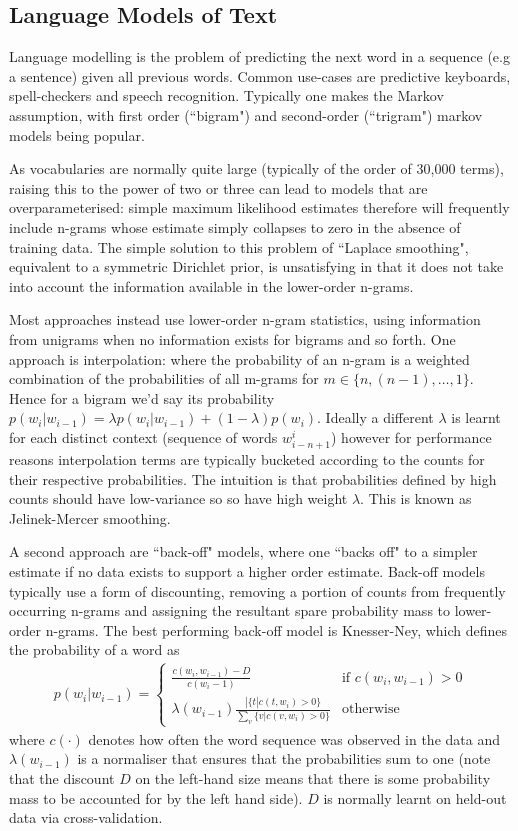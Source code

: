 

\subsection{Language Models of Text}
\label{sec:langmodels}
Language modelling is the problem of predicting the next word in a sequence (e.g a sentence) given all previous words. Common use-cases are predictive keyboards, spell-checkers and speech recognition. Typically one makes the Markov assumption, with first order (``bigram") and second-order (``trigram") markov models being popular.

As vocabularies are normally quite large (typically of the order of 30,000 terms), raising this to the power of two or three can lead to models that are overparameterised: simple maximum likelihood estimates therefore will frequently include n-grams whose estimate simply collapses to zero in the absence of training data. The simple solution to this problem  of ``Laplace smoothing", equivalent to a symmetric Dirichlet prior, is unsatisfying in that it does not take into account the information available in the lower-order n-grams.

Most approaches instead use lower-order n-gram statistics, using information from unigrams when no information exists for bigrams and so forth. One approach is interpolation: where the probability of an n-gram is a weighted combination of the probabilities of all m-grams for $m \in \{n, (n-1), \ldots, 1\}$. Hence for a bigram we'd say its probability $p(w_i|w_{i-1}) = \lambda p(w_i|w_{i-1}) + (1 - \lambda) p(w_i)$. Ideally a different $\lambda$ is learnt for each distinct context (sequence of words $w^i_{i-n+1}$) however for performance reasons interpolation terms are typically bucketed according to the counts for their respective probabilities. The intuition is that probabilities defined by high counts should have low-variance so so have high weight $\lambda$. This is known as Jelinek-Mercer smoothing.

A second approach are ``back-off" models, where one ``backs off" to a simpler estimate if no data exists to support a higher order estimate. Back-off models typically use a form of discounting, removing a portion of counts from frequently occurring n-grams and assigning the resultant spare probability mass to lower-order n-grams. The best performing back-off model is Knesser-Ney, which defines the probability of a word as 
\begin{align}
p(w_i | w_{i-1}) = \left\{ \begin{array}{lr}
     \frac{c(w_i, w_{i-1}) - D}{c(w_i-1)} & \text{if } c(w_i, w_{i-1}) > 0 \\
     \lambda(w_{i-1})\frac{ | \{t | c(t, w_i) > 0\} }{\sum_v \{v | c(v, w_i) > 0\}} & \text{otherwise}
 \end{array}
\right.
\end{align}
where $c(\cdot)$ denotes how often the word sequence was observed in the data and $\lambda(w_{i-1})$ is a normaliser that ensures that the probabilities sum to one (note that the discount $D$ on the left-hand size means that there is some probability mass to be accounted for by the left hand side). $D$ is normally learnt on held-out data via cross-validation.

